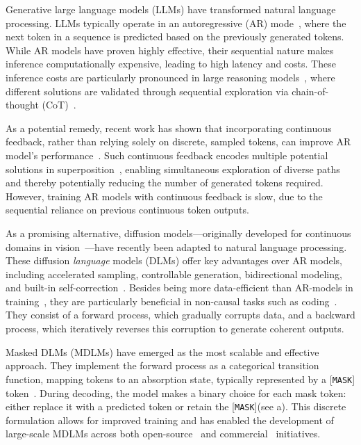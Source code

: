 \documentclass{article}
\newcommand{\mask}{[\texttt{MASK}]\xspace}
\begin{document}
Generative large language models (LLMs) have transformed natural language processing. 
%
LLMs typically operate in an autoregressive (AR) mode~\citep{vaswani_attention_2017, brown_language_2020}, where the next token in a sequence is predicted based on the previously generated tokens. 
%
While AR models have proven highly effective, their sequential nature makes inference computationally expensive, leading to high latency and costs. 
%
These inference costs are particularly pronounced in large reasoning models~\citep{openai_learning_2024, deepseekai2025short, qwen_qwq_2024}, where different solutions are validated through sequential exploration via chain-of-thought (CoT)~\citep{wei_chain--thought_2022}.
%

As a potential remedy, recent work has shown that incorporating continuous feedback, rather than relying solely on discrete, sampled tokens, can improve AR model's performance~\citep{hao_training_2024, zhuang_text_2025, zhang_soft_2025}.
%
Such continuous feedback encodes multiple potential solutions in superposition~\citep{zhu_reasoning_2025}, enabling simultaneous exploration of diverse paths and thereby potentially reducing the number of generated tokens required.
%
However, training AR models with continuous feedback is slow, due to the sequential reliance on previous continuous token outputs.



As a promising alternative, diffusion models---originally developed for continuous domains in vision~\citep{sohl-dickstein_deep_2015, ho_denoising_2020, song_score-based_2020}---have recently been adapted to natural language processing. These diffusion \emph{language} models (DLMs) offer key advantages over AR models, including accelerated sampling, controllable generation, bidirectional modeling, and built-in self-correction~\citep{ye_diffusion_2024}.  
%
Besides being more data-efficient than AR-models in training~\citep{ni_diffusion_2025}, they are particularly beneficial in non-causal tasks such as coding~\citep{nie_large_2025, gong_diffucoder_2025, xie_dream-coder_2025}.
They consist of a forward process, which gradually corrupts data, and a backward process, which iteratively reverses this corruption to generate coherent outputs.

Masked DLMs (MDLMs) have emerged as the most scalable and effective approach. 
%
They implement the forward process as a categorical transition function, mapping tokens to an absorption state, typically represented by a \mask token~\citep{austin_structured_2021, campbell_continuous_2022, lou_discrete_2024, sahoo_simple_2024, ou_your_2024, shi_simplified_2024}.
%
During decoding, the model makes a binary choice for each mask token: either replace it with a predicted token or retain the \mask (see a). 
%
This discrete formulation allows for improved training and has enabled the development of large-scale MDLMs across both open-source~\citep{gong_scaling_2025, nie_large_2025, ye_dream_2025, xie_dream-coder_2025} and commercial~\citep{inception_mercury_2025, deepmind_gemini_2025} initiatives.
\end{document}
